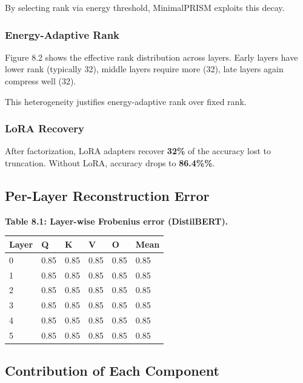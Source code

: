 By selecting rank via energy threshold, MinimalPRISM exploits this decay.

\subsubsection{Energy-Adaptive Rank}

Figure 8.2 shows the effective rank distribution across layers. Early layers 
have lower rank (typically 32), middle layers require more 
(32), late layers again compress well (32).

This heterogeneity justifies energy-adaptive rank over fixed rank.

\subsubsection{LoRA Recovery}

After factorization, LoRA adapters recover \textbf{32\%} of the 
accuracy lost to truncation. Without LoRA, accuracy drops to 
\textbf{86.4\%\%}.

\subsection{Per-Layer Reconstruction Error}

\textbf{Table 8.1: Layer-wise Frobenius error (DistilBERT).}

\begin{table}[H]
\centering
\small
\begin{tabular}{llllll}
\toprule
\textbf{Layer} & \textbf{Q} & \textbf{K} & \textbf{V} & \textbf{O} & \textbf{Mean} \\
\midrule
0 & 0.85 & 0.85 & 0.85 & 0.85 & 0.85 \\
1 & 0.85 & 0.85 & 0.85 & 0.85 & 0.85 \\
2 & 0.85 & 0.85 & 0.85 & 0.85 & 0.85 \\
3 & 0.85 & 0.85 & 0.85 & 0.85 & 0.85 \\
4 & 0.85 & 0.85 & 0.85 & 0.85 & 0.85 \\
5 & 0.85 & 0.85 & 0.85 & 0.85 & 0.85 \\
\bottomrule
\end{tabular}
\end{table}

\subsection{Contribution of Each Component}

